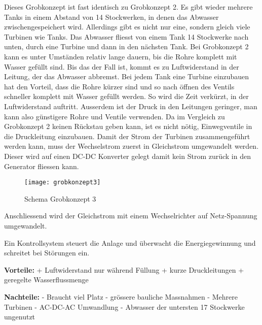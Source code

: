 Dieses Grobkonzept ist fast identisch zu Grobkonzept 2. Es gibt wieder mehrere Tanks in einem Abstand von 14 Stockwerken, in denen das Abwasser zwischengespeichert wird. Allerdings gibt es nicht nur eine, sondern gleich viele Turbinen wie Tanks. Das Abwasser fliesst von einem Tank 14 Stockwerke nach unten, durch eine Turbine und dann in den nächsten Tank. Bei Grobkonzept 2 kann es unter Umständen relativ lange dauern, bis die Rohre komplett mit Wasser gefüllt sind. Bis das der Fall ist, kommt es zu Luftwiderstand in der Leitung, der das Abwasser abbremst. Bei jedem Tank eine Turbine einzubauen hat den Vorteil, dass die Rohre kürzer sind und so nach öffnen des Ventils schneller komplett mit Wasser gefüllt werden. So wird die Zeit verkürzt, in der Luftwiderstand auftritt. Ausserdem ist der Druck in den Leitungen geringer, man kann also günstigere Rohre und Ventile verwenden. Da im Vergleich zu Grobkonzept 2 keinen Rückstau geben kann, ist es nicht nötig, Einwegventile in die Druckleitung einzubauen. 
Damit der Strom der Turbinen zusammengeführt werden kann, muss der Wechselstrom zuerst in Gleichstrom umgewandelt werden. Dieser wird auf einen DC-DC Konverter gelegt damit kein Strom zurück in den Generator fliessen kann.
\newpage
\begin{wrapfigure}{r}{0.5\textwidth}
  \begin{center}
    \texttt{[image: grobkonzept3]}
  \end{center}
  \caption{Schema Grobkonzept 3}
\end{wrapfigure}

Anschliessend wird der Gleichstrom mit einem Wechselrichter auf Netz-Spannung umgewandelt.

Ein Kontrollsystem steuert die Anlage und überwacht die Energiegewinnung und schreitet bei Störungen ein.

\textbf{Vorteile:} 									\newline
+	Luftwiderstand nur während Füllung				\newline
+	kurze Druckleitungen								\newline
+	geregelte Wasserflussmenge						\newline

\textbf{Nachteile:}									\newline
-	Braucht viel Platz								\newline
-	grössere bauliche Massnahmen						\newline
-	Mehrere Turbinen									\newline
-	AC-DC-AC Umwandlung								\newline
-	Abwasser der untersten 17 Stockwerke ungenutzt	\newline
\WFclear			
\newpage